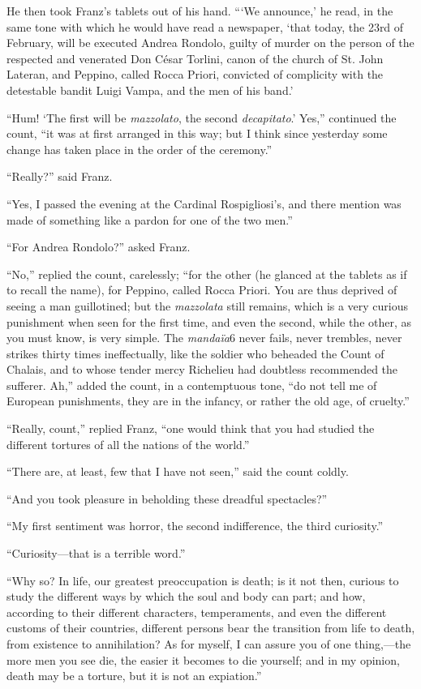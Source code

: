 He then took Franz’s tablets out of his hand. “‘We announce,’ he read,
in the same tone with which he would have read a newspaper, ‘that
today, the 23rd of February, will be executed Andrea Rondolo, guilty of
murder on the person of the respected and venerated Don César Torlini,
canon of the church of St. John Lateran, and Peppino, called Rocca
Priori, convicted of complicity with the detestable bandit Luigi Vampa,
and the men of his band.’

“Hum! ‘The first will be \textit{mazzolato}, the second \textit{decapitato}.’ Yes,”
continued the count, “it was at first arranged in this way; but I think
since yesterday some change has taken place in the order of the
ceremony.”

“Really?” said Franz.

“Yes, I passed the evening at the Cardinal Rospigliosi’s, and there
mention was made of something like a pardon for one of the two men.”

“For Andrea Rondolo?” asked Franz.

“No,” replied the count, carelessly; “for the other (he glanced at the
tablets as if to recall the name), for Peppino, called Rocca Priori.
You are thus deprived of seeing a man guillotined; but the \textit{mazzolata}
still remains, which is a very curious punishment when seen for the
first time, and even the second, while the other, as you must know, is
very simple. The \textit{mandaïa}6 never fails, never trembles, never strikes
thirty times ineffectually, like the soldier who beheaded the Count of
Chalais, and to whose tender mercy Richelieu had doubtless recommended
the sufferer. Ah,” added the count, in a contemptuous tone, “do not
tell me of European punishments, they are in the infancy, or rather the
old age, of cruelty.”

“Really, count,” replied Franz, “one would think that you had studied
the different tortures of all the nations of the world.”

“There are, at least, few that I have not seen,” said the count coldly.

“And you took pleasure in beholding these dreadful spectacles?”

“My first sentiment was horror, the second indifference, the third
curiosity.”

“Curiosity—that is a terrible word.”

“Why so? In life, our greatest preoccupation is death; is it not then,
curious to study the different ways by which the soul and body can
part; and how, according to their different characters, temperaments,
and even the different customs of their countries, different persons
bear the transition from life to death, from existence to annihilation?
As for myself, I can assure you of one thing,—the more men you see die,
the easier it becomes to die yourself; and in my opinion, death may be
a torture, but it is not an expiation.”

